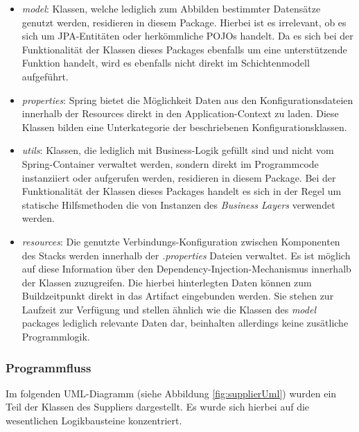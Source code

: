 \begin{itemize}
  \item \emph{model}: Klassen, welche lediglich zum Abbilden bestimmter Datensätze genutzt werden, residieren in diesem Package. Hierbei ist es irrelevant, ob es sich um JPA-Entitäten oder herkömmliche POJOs handelt. Da es sich bei der Funktionalität der Klassen dieses Packages ebenfalls um eine unterstützende Funktion handelt, wird es ebenfalls nicht direkt im Schichtenmodell aufgeführt.

  \item \emph{properties}: Spring bietet die Möglichkeit Daten aus den Konfigurationsdateien innerhalb der Resources direkt in den Application-Context zu laden. Diese Klassen bilden eine Unterkategorie der beschriebenen Konfigurationsklassen.
  
  \item \emph{utils}: Klassen, die lediglich mit Business-Logik gefüllt sind und nicht vom Spring-Container verwaltet werden, sondern direkt im Programmcode instanziiert oder aufgerufen werden, residieren in diesem Package. Bei der Funktionalität der Klassen dieses Packages handelt es sich in der Regel um statische Hilfsmethoden die von Instanzen des \emph{Business Layers} verwendet werden.
  
  \item \emph{resources}: Die genutzte Verbindungs-Konfiguration zwischen Komponenten des Stacks werden innerhalb der \emph{.properties} Dateien verwaltet. Es ist möglich auf diese Information über den Dependency-Injection-Mechanismus innerhalb der Klassen zuzugreifen. Die hierbei hinterlegten Daten können zum Buildzeitpunkt direkt in das Artifact eingebunden werden. Sie stehen zur Laufzeit zur Verfügung und stellen ähnlich wie die Klassen des \emph{model} packages lediglich relevante Daten dar, beinhalten allerdings keine zusätliche Programmlogik. 

\end{itemize}

\subsubsection{Programmfluss}
Im folgenden UML-Diagramm (siehe Abbildung \ref{fig:supplierUml}) wurden ein Teil der Klassen des Suppliers dargestellt. Es wurde sich hierbei auf die wesentlichen Logikbausteine konzentriert. 

